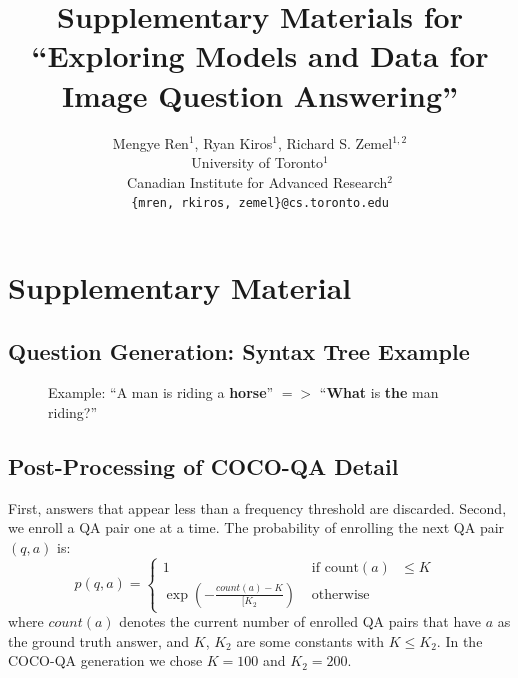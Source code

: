 \documentclass{article} %
\author{
Mengye Ren${}^1$, Ryan Kiros${}^1$, Richard S. Zemel${}^{1, 2}$\\
University of Toronto${}^1$\\
Canadian Institute for Advanced Research${}^2$\\
\texttt{\{mren, rkiros, zemel\}@cs.toronto.edu}
}
\title{Supplementary Materials for ``Exploring Models and Data for Image
Question Answering''}
\renewcommand{\#}[1]{\textbf{#1}}
\begin{document}
\maketitle
\appendix
\section{Supplementary Material}
\subsection{Question Generation: Syntax Tree Example}
\begin{figure}[h!]
    \centering
    \small
     
    \vspace{5mm}
    \caption{Example: ``A man is riding a \textbf{horse}'' $=>$ ``\textbf{What} is \textbf{the} man riding?''}
    \label{fig:what_gen}
\end{figure}

\subsection{Post-Processing of COCO-QA Detail}
\label{app:post_process}
First, answers that appear less than a frequency threshold are discarded.
Second, we enroll a QA pair one at a time.  The probability of enrolling the
next QA pair $(q, a)$ is:
\begin{equation}
p(q, a) = \left\{ \begin{array}{cl}
1 &\mbox{ if count$(a)$ $\le K$ } \\
\exp\left(-\frac{count(a) - K}{[K_2}\right) &\mbox{ otherwise }
\end{array} \right.
\end{equation}
where $count(a)$ denotes the current number of enrolled QA pairs that have $a$
as the ground truth answer, and $K$, $K_2$ are some constants with $K \le K_2$.
In the COCO-QA generation we chose $K = 100$ and $K_2 = 200$. 

\clearpage
\end{document}
